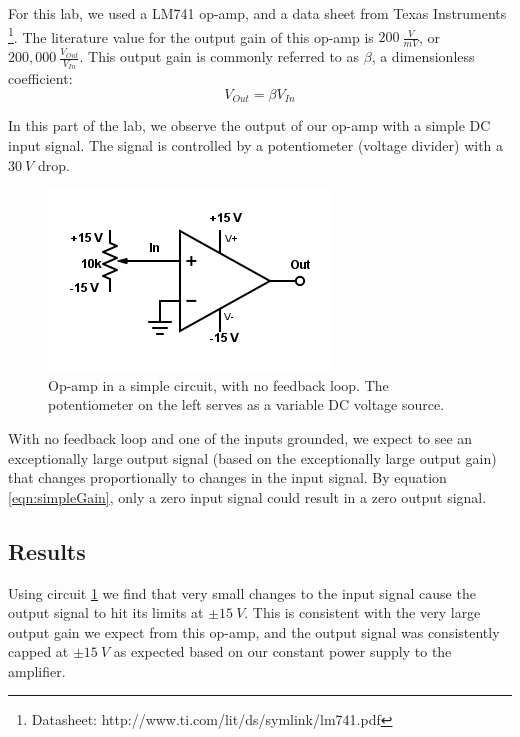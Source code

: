 \documentclass[11pt]{article}
\begin{document}
For this lab, we used a LM741 op-amp, and a data sheet from Texas Instruments \footnote{Datasheet: http://www.ti.com/lit/ds/symlink/lm741.pdf}. The literature value for the output gain of this op-amp is $200\ \frac{V}{mV}$, or $200,000\ \frac{V_{Out}}{V_{In}}$. This output gain is commonly referred to as $\beta$, a dimensionless coefficient:\\

\begin{equation}
    V_{Out} = \beta V_{In}
    \label{eqn:simpleGain}
\end{equation}

In this part of the lab, we observe the output of our op-amp with a simple DC input signal. The signal is controlled by a potentiometer (voltage divider) with a $30\ V$ drop.\\

\begin{figure}[H]
    \centering
    \includegraphics[scale=0.5]{Diagrams/c-a.png}
    \caption{Op-amp in a simple circuit, with no feedback loop. The potentiometer on the left serves as a variable DC voltage source.}
    \label{circuit:a}
\end{figure}

With no feedback loop and one of the inputs grounded, we expect to see an exceptionally large output signal (based on the exceptionally large output gain) that changes proportionally to changes in the input signal. By equation \ref{eqn:simpleGain}, only a zero input signal could result in a zero output signal.\\


\subsection{Results}

Using circuit \ref{circuit:a} we find that very small changes to the input signal cause the output signal to hit its limits at $\pm 15\ V$. This is consistent with the very large output gain we expect from this op-amp, and the output signal was consistently capped at $\pm 15\ V$ as expected based on our constant power supply to the amplifier.\\
\end{document}
